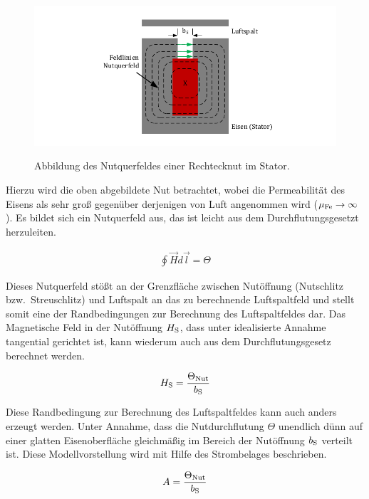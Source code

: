\begin{figure}[!htb]
\centering
\includegraphics{_Bilder/nutquerfeld.pdf}
\label{fig:nutquerfeld}
\caption{Abbildung des Nutquerfeldes einer Rechtecknut im Stator.}
\end{figure}

Hierzu wird die oben abgebildete Nut betrachtet, wobei die Permeabilität des Eisens als sehr groß gegenüber derjenigen von Luft angenommen wird ($\mu_{\mathrm{Fe}} \rightarrow \infty$).
Es bildet sich ein Nutquerfeld aus, das ist leicht aus dem Durchflutungsgesetzt herzuleiten.

\begin{align}
\oint \vec{H}d\vec{l} = \Theta \label{eqn:durchflutungsgesetzt}
\end{align}

Dieses Nutquerfeld stößt an der Grenzfläche zwischen Nutöffnung (Nutschlitz bzw.\ Streuschlitz) und Luftspalt an das zu berechnende Luftspaltfeld und stellt somit eine der Randbedingungen zur Berechnung des Luftspaltfeldes dar.
Das Magnetische Feld in der Nutöffnung $H_{\mathrm{S}}$, dass unter idealisierte Annahme tangential gerichtet ist, kann wiederum auch aus dem Durchflutungsgesetz berechnet werden.

\begin{align}
H_{\mathrm{S}} = \frac{\Theta_{\mathrm{Nut}}}{b_{\mathrm{S}}}
\end{align}

Diese Randbedingung zur Berechnung des Luftspaltfeldes kann auch anders erzeugt werden.
Unter Annahme, dass die Nutdurchflutung $\Theta$ unendlich dünn auf einer glatten Eisenoberfläche gleichmäßig im Bereich der Nutöffnung $b_{\mathrm{S}}$ verteilt ist.
Diese Modellvorstellung wird mit Hilfe des Strombelages beschrieben.

\begin{align}
A = \frac{\Theta_{\mathrm{Nut}}}{b_{\mathrm{S}}}
\end{align}

